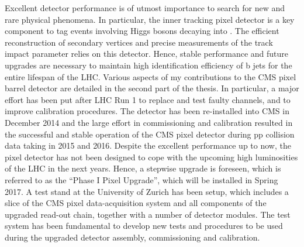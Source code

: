 \noindent Excellent detector performance is of utmost importance to search for new and rare physical phenomena.
In particular, the inner tracking pixel detector is a key component to tag events involving Higgs bosons decaying into \bbbar.
The efficient reconstruction of secondary vertices and precise measurements of the track impact parameter relies on this detector.
Hence, stable performance and future upgrades are necessary to maintain high identification efficiency of b jets for the entire lifespan of the LHC.
Various aspects of my contributions to the CMS pixel barrel detector are detailed in the second part of the thesis.
In particular, a major effort has been put after LHC Run 1 to replace and test faulty channels, and to improve calibration procedures.
The detector has been re-installed into CMS in December 2014 and the large effort in commissioning and calibration 
resulted in the successful and stable operation of the CMS pixel detector during pp collision data taking in 2015 and 2016.
Despite the excellent performance up to now, the pixel detector has not been designed to cope with the upcoming high luminosities of the LHC in the next years.
Hence, a stepwise upgrade is foreseen, which is referred to as the ``Phase I Pixel Upgrade'', which will be installed in Spring 2017.
A test stand at the University of Zurich has been setup, which includes a slice of the CMS pixel data-acquisition system and all components of the upgraded read-out chain, together with a number of detector modules.
The test system has been fundamental to develop new tests and procedures to be used during the upgraded detector assembly, commissioning and calibration.

\vspace*{\fill}
